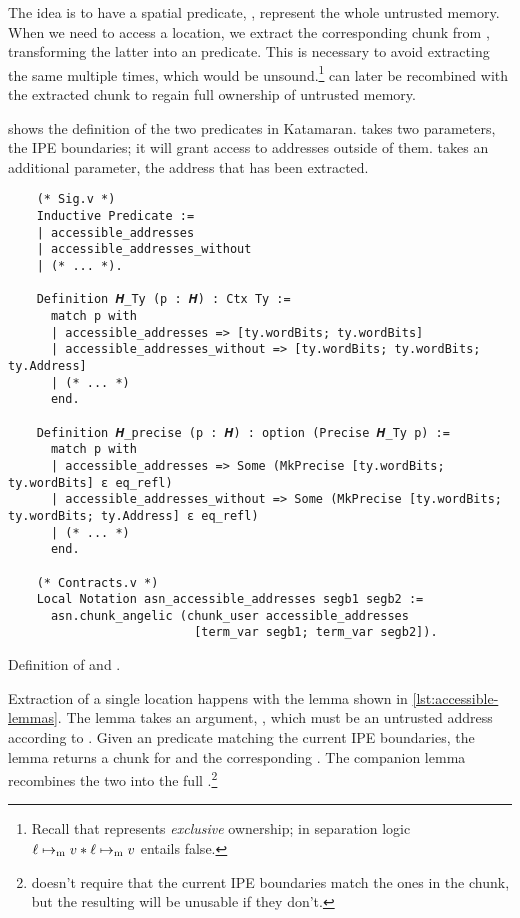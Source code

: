 The idea is to have a spatial predicate, , represent the whole untrusted memory. When we need to access a location, we extract the corresponding  chunk from , transforming the latter into an \linebreak {} predicate. This is necessary to avoid extracting the same  multiple times, which would be unsound.\footnote{Recall that  represents \emph{exclusive} ownership; in separation logic \(\ell \mapsto_{\mathrm{m}} v \ast \ell \mapsto_{\mathrm{m}} v\) entails false.}  can later be recombined with the extracted chunk to regain full ownership of untrusted memory.

 shows the definition of the two predicates in Katamaran.  takes two parameters, the IPE boundaries; it will grant access to addresses outside of them.  takes an additional parameter, the address that has been extracted. %

\begin{listing}
  \begin{verbatim}
    (* Sig.v *)
    Inductive Predicate :=
    | accessible_addresses
    | accessible_addresses_without
    | (* ... *).

    Definition 𝑯_Ty (p : 𝑯) : Ctx Ty :=
      match p with
      | accessible_addresses => [ty.wordBits; ty.wordBits]
      | accessible_addresses_without => [ty.wordBits; ty.wordBits; ty.Address]
      | (* ... *)
      end.

    Definition 𝑯_precise (p : 𝑯) : option (Precise 𝑯_Ty p) :=
      match p with
      | accessible_addresses => Some (MkPrecise [ty.wordBits; ty.wordBits] ε eq_refl)
      | accessible_addresses_without => Some (MkPrecise [ty.wordBits; ty.wordBits; ty.Address] ε eq_refl)
      | (* ... *)
      end.

    (* Contracts.v *)
    Local Notation asn_accessible_addresses segb1 segb2 :=
      asn.chunk_angelic (chunk_user accessible_addresses
                          [term_var segb1; term_var segb2]).
  \end{verbatim}
  \caption{Definition of  and .}
  \label{lst:accessible_addresses}
\end{listing}

Extraction of a single location happens with the  lemma shown in \cref{lst:accessible-lemmas}. The lemma takes an argument, , which must be an untrusted address according to . Given an  predicate matching the current IPE boundaries, the lemma returns a  chunk for  and the corresponding . The companion lemma  recombines the two into the full .\footnote{ doesn't require that the current IPE boundaries match the ones in the  chunk, but the resulting  will be unusable if they don't.}

